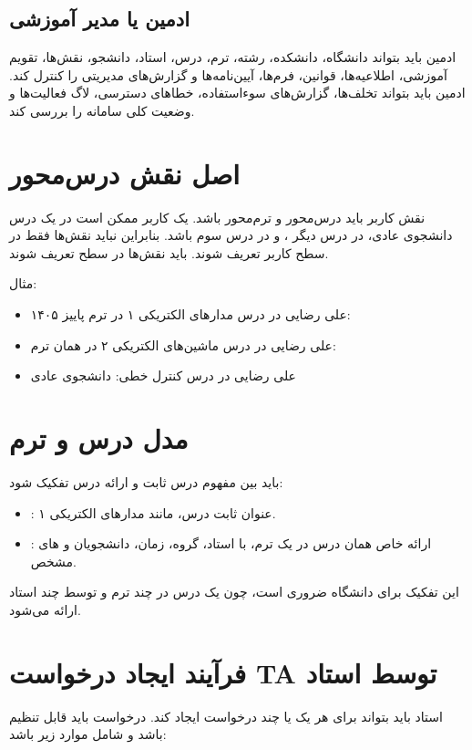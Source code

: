 \documentclass[12pt,a4paper]{article}
\begin{document}
\subsection{ادمین یا مدیر آموزشی}
ادمین باید بتواند دانشگاه، دانشکده، رشته، ترم، درس، استاد، دانشجو، نقش‌ها، تقویم آموزشی، اطلاعیه‌ها، قوانین، فرم‌ها، آیین‌نامه‌ها و گزارش‌های مدیریتی را کنترل کند. ادمین باید بتواند تخلف‌ها، گزارش‌های سوءاستفاده، خطاهای دسترسی، لاگ فعالیت‌ها و وضعیت کلی سامانه را بررسی کند.

\section{اصل نقش درس‌محور}
نقش کاربر باید درس‌محور و ترم‌محور باشد. یک کاربر ممکن است در یک درس دانشجوی عادی، در درس دیگر ، و در درس سوم  باشد. بنابراین نباید نقش‌ها فقط در سطح کاربر تعریف شوند. باید نقش‌ها در سطح  تعریف شوند.

مثال:
\begin{itemize}
\item علی رضایی در درس مدارهای الکتریکی ۱ در ترم پاییز ۱۴۰۵: 
\item علی رضایی در درس ماشین‌های الکتریکی ۲ در همان ترم: 
\item علی رضایی در درس کنترل خطی: دانشجوی عادی
\end{itemize}

\section{مدل درس و ترم}
باید بین مفهوم درس ثابت و ارائه درس تفکیک شود:
\begin{itemize}
\item {}: عنوان ثابت درس، مانند مدارهای الکتریکی ۱.
\item {}: ارائه خاص همان درس در یک ترم، با استاد، گروه، زمان، دانشجویان و های مشخص.
\end{itemize}

این تفکیک برای دانشگاه ضروری است، چون یک درس در چند ترم و توسط چند استاد ارائه می‌شود.

\section{فرآیند ایجاد درخواست TA توسط استاد}
استاد باید بتواند برای هر  یک یا چند درخواست ایجاد کند. درخواست باید قابل تنظیم باشد و شامل موارد زیر باشد:
\end{document}

